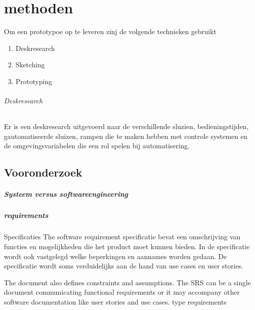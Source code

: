 \chapter{methoden}



Om een prototypoe op te leveren zinj de volgende technieken gebruikt

\begin{enumerate}
	\item Deskresearch
	\item Sketching
	\item Prototyping
\end{enumerate}

\subparagraph{Deskresearch}
Er is een deskresearch uitgevoerd naar de verschillende sluzien, bedieningstijden, gautomatiseerde sluizen, rampen die te maken hebben met controle systemen en de omgevingsvariabelen die een rol spelen bij automatisering.
\label{chapter:body}
\thispagestyle{myheadings}

\graphicspath{{2_Body/Figures/}}

\section{Vooronderzoek}


\paragraph{Systeem versus softwareengineering}


\paragraph{requirements}

Specificaties
The software requirement specificatie bevat een omschrijving van functies en mogelijkheden die het product moet kunnen bieden. In de specificatie wordt ook vastgelegd welke beperkingen en aannames worden gedaan. De specificatie wordt soms verduidelijks aan de hand van use cases en user stories.




The document also defines constraints and assumptions. The SRS can be a single document communicating functional requirements or it may accompany other software documentation like user stories and use cases.
type requirements 

